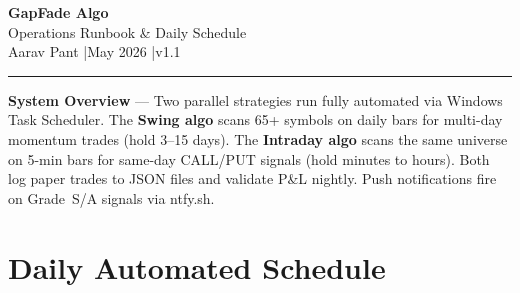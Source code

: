 \documentclass[11pt,a4paper]{article}
\begin{document}
\begin{center}
  {\Huge\bfseries\color{accent} GapFade Algo}\\[4pt]
  {\large\color{darkgray} Operations Runbook \& Daily Schedule}\\[10pt]
  {\normalsize\color{darkgray} Aarav Pant \quad|\quad May 2026 \quad|\quad v1.1}\\[6pt]
  \color{accent}\rule{0.6\linewidth}{1.5pt}
\end{center}

\vspace{6pt}

\begin{infobox}
\textbf{System Overview} --- Two parallel strategies run fully automated via Windows Task Scheduler.
The \textbf{Swing algo} scans 65+ symbols on daily bars for multi-day momentum trades (hold 3--15 days).
The \textbf{Intraday algo} scans the same universe on 5-min bars for same-day CALL/PUT signals (hold minutes to hours).
Both log paper trades to JSON files and validate P\&L nightly. Push notifications fire on Grade~S/A signals via ntfy.sh.
\end{infobox}

\section{Daily Automated Schedule}
\end{document}

